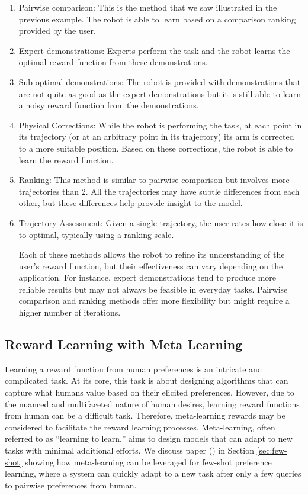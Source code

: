 \documentclass[
  letterpaper,
  DIV=11,
  numbers=noendperiod,
  oneside]{scrreprt}
\theoremstyle{remark}
\begin{document}
\begin{enumerate}
\def\labelenumi{\arabic{enumi}.}
\item
  Pairwise comparison: This is the method that we saw illustrated in the
  previous example. The robot is able to learn based on a comparison
  ranking provided by the user.
\item
  Expert demonstrations: Experts perform the task and the robot learns
  the optimal reward function from these demonstrations.
\item
  Sub-optimal demonstrations: The robot is provided with demonstrations
  that are not quite as good as the expert demonstrations but it is
  still able to learn a noisy reward function from the demonstrations.
\item
  Physical Corrections: While the robot is performing the task, at each
  point in its trajectory (or at an arbitrary point in its trajectory)
  its arm is corrected to a more suitable position. Based on these
  corrections, the robot is able to learn the reward function.
\item
  Ranking: This method is similar to pairwise comparison but involves
  more trajectories than 2. All the trajectories may have subtle
  differences from each other, but these differences help provide
  insight to the model.
\item
  Trajectory Assessment: Given a single trajectory, the user rates how
  close it is to optimal, typically using a ranking scale.

  Each of these methods allows the robot to refine its understanding of
  the user's reward function, but their effectiveness can vary depending
  on the application. For instance, expert demonstrations tend to
  produce more reliable results but may not always be feasible in
  everyday tasks. Pairwise comparison and ranking methods offer more
  flexibility but might require a higher number of iterations.
\end{enumerate}

\subsection{Reward Learning with Meta
Learning}\label{reward-learning-with-meta-learning}

Learning a reward function from human preferences is an intricate and
complicated task. At its core, this task is about designing algorithms
that can capture what humans value based on their elicited preferences.
However, due to the nuanced and multifaceted nature of human desires,
learning reward functions from human can be a difficult task. Therefore,
meta-learning rewards may be considered to facilitate the reward
learning processes. Meta-learning, often referred to as ``learning to
learn,'' aims to design models that can adapt to new tasks with minimal
additional efforts. We discuss paper () in Section
\hyperref[sec:few-shot]{{[}sec:few-shot{]}} showing how meta-learning
can be leveraged for few-shot preference learning, where a system can
quickly adapt to a new task after only a few queries to pairwise
preferences from human.
\end{document}
